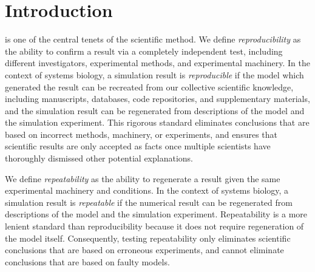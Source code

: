 \documentclass[journal,transmag,twoside]{IEEEtran}
\begin{document}
\section{Introduction}
% 
% 
% 
% 
 is one of the central tenets of the scientific method.
We define \textit{reproducibility} as the ability to confirm a result via a completely independent test, including different investigators, experimental methods, and experimental machinery. In the context of systems biology, a simulation result is \textit{reproducible} if the model which generated the result can be recreated from our collective scientific knowledge, including manuscripts, databases, code repositories, and supplementary materials, and the simulation result can be regenerated from descriptions of the model and the simulation experiment.
This rigorous standard eliminates conclusions that are based on incorrect methods, machinery, or experiments, and ensures that scientific results are only accepted as facts once multiple scientists have thoroughly dismissed other potential explanations. 

We define \textit{repeatability} as the ability to regenerate a result given the same experimental machinery and conditions. In the context of systems biology, a simulation result is \textit{repeatable} if the numerical result can be regenerated from descriptions of the model and the simulation experiment.
Repeatability is a more lenient standard than reproducibility because it does not require regeneration of the model itself. 
Consequently, testing repeatability only eliminates scientific conclusions that are based on erroneous experiments, and cannot eliminate conclusions that are based on faulty models.
\end{document}
